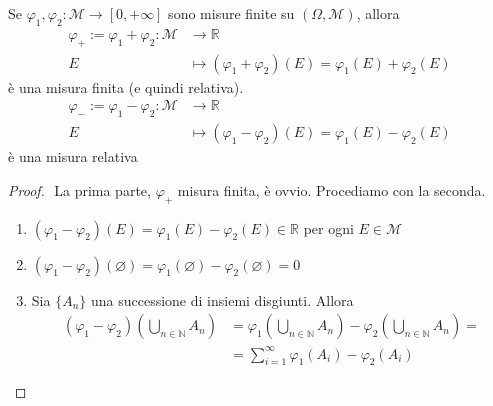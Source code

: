 \begin{proposition}
    Se \(\varphi_{1}, \varphi_{2}: \mathcal{M} \to  [0, +\infty]\) sono misure
    finite su \((\Omega, \mathcal{M})\), allora 
    \begin{align*}
        \varphi_+ := \varphi_{1} + \varphi_{2}: \mathcal{M} &\longrightarrow \mathbb{R} \\
        E &\longmapsto (\varphi_{1} + \varphi_{2})(E) = \varphi_{1}(E) +
        \varphi_{2}(E)
    \end{align*}
    è una misura finita (e quindi relativa).
    \begin{align*}
        \varphi_- := \varphi_{1} - \varphi_{2}: \mathcal{M} &\longrightarrow \mathbb{R} \\
        E &\longmapsto (\varphi_{1} - \varphi_{2})(E) = \varphi_{1}(E) -
        \varphi_{2}(E)
    \end{align*}
    è una misura relativa
\end{proposition}
\begin{proof} \(\) 
La prima parte, \(\varphi_+\) misura finita, è ovvio. Procediamo con la seconda.

\begin{enumerate}[label = \arabic*.]
    \item \((\varphi_{1} - \varphi_{2})(E) = \varphi_{1}(E) - \varphi_{2}(E) \in
        \mathbb{R}\) per ogni \(E \in \mathcal{M}\) 
    \item \((\varphi_{1}-\varphi_{2})(\varnothing) = \varphi_{1}(\varnothing) -
        \varphi_{2}(\varnothing) = 0\)
    \item Sia \(\{A_{n}\} \) una successione di insiemi disgiunti. Allora
        \begin{align*}
            (\varphi_{1}-\varphi_{2})\left( \bigcup_{n \in \mathbb{N}} A_{n}
            \right) &= \varphi_{1}\left( \bigcup_{n \in \mathbb{N}} A_{n} \right)
            - \varphi_{2}\left( \bigcup_{n \in \mathbb{N}} A_{n}  \right) = \\
                    &= \sum_{i=1}^{\infty} \varphi_{1}(A_{i}) - \varphi_{2}(A_{i})
        \end{align*}
\end{enumerate}
\end{proof}

